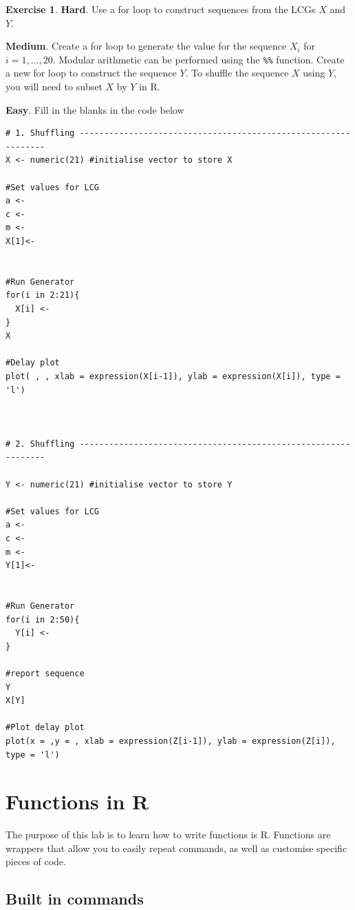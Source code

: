 \documentclass[
]{book}
\theoremstyle{definition}
\theoremstyle{definition}
\theoremstyle{definition}
\newtheorem{exercise}{Exercise}[chapter]
\theoremstyle{definition}
\theoremstyle{remark}
\begin{document}
\begin{exercise}
\textbf{Hard}. Use a for loop to construct sequences from the LCGs \(X\) and \(Y\).

\textbf{Medium}. Create a for loop to generate the value for the sequence \(X_i\) for \(i = 1, \ldots, 20\). Modular arithmetic can be performed using the \texttt{\%\%} function. Create a new for loop to construct the sequence \(Y\). To shuffle the sequence \(X\) using \(Y\), you will need to subset \(X\) by \(Y\) in R.

\textbf{Easy}. Fill in the blanks in the code below

\begin{verbatim}
# 1. Shuffling ---------------------------------------------------------------
X <- numeric(21) #initialise vector to store X

#Set values for LCG
a <- 
c <- 
m <- 
X[1]<- 


#Run Generator
for(i in 2:21){
  X[i] <-
}
X

#Delay plot
plot( , , xlab = expression(X[i-1]), ylab = expression(X[i]), type = 'l')



# 2. Shuffling ---------------------------------------------------------------

Y <- numeric(21) #initialise vector to store Y

#Set values for LCG
a <- 
c <- 
m <- 
Y[1]<- 


#Run Generator
for(i in 2:50){
  Y[i] <- 
}

#report sequence
Y
X[Y]

#Plot delay plot
plot(x = ,y = , xlab = expression(Z[i-1]), ylab = expression(Z[i]), type = 'l')
\end{verbatim}

\end{exercise}

\section{Functions in R}\label{functions-in-r}

The purpose of this lab is to learn how to write functions is R. Functions are wrappers that allow you to easily repeat commands, as well as customise specific pieces of code.

\subsection{Built in commands}\label{built-in-commands}
\end{document}
